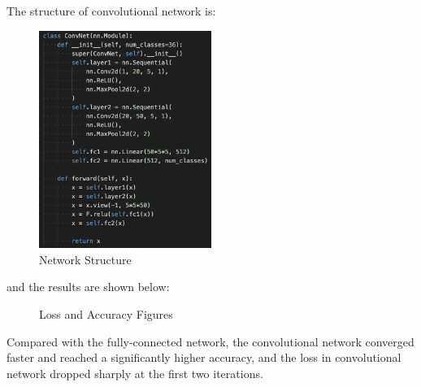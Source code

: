 \documentclass[11pt]{article} \usepackage{fullpage} \usepackage{graphicx} \usepackage{epstopdf} \usepackage{color} \usepackage{psfrag} \usepackage{pdfsync}\usepackage{indentfirst}\usepackage{subfigure}\usepackage{float}\usepackage[section]{placeins}
\begin{document}
The structure of convolutional network is:
\begin{figure}[H]
\centering
\includegraphics[width=0.5\textwidth]{results/q6_1_2.png}
\caption{Network Structure}
\end{figure}
and the results are shown below:

\begin{figure}[H]
\centering
{}
\caption{Loss and Accuracy Figures}
\end{figure}

Compared with the fully-connected network, the convolutional network converged faster and reached a significantly higher accuracy, and the loss in convolutional network dropped sharply at the first two iterations.
\end{document}
